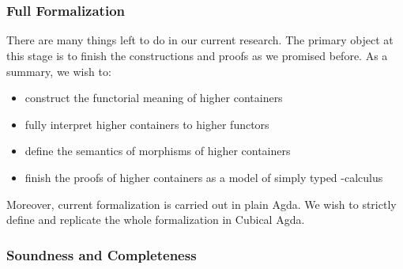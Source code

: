 \begin{code}[hide]
\AgdaSymbol{:}\AgdaSpace{}%
\AgdaSymbol{(}\AgdaSpace{}%
\AgdaSymbol{:}\AgdaSpace{}%
\AgdaSymbol{)}\AgdaSpace{}%
\AgdaSpace{}%
\AgdaSymbol{(}\AgdaSpace{}%
\AgdaSpace{}%
\AgdaSpace{}%
\AgdaSpace{}%
\AgdaSymbol{)}\AgdaSpace{}%
\AgdaSpace{}%
\AgdaSpace{}%
\AgdaSpace{}%
\<%
\\
\>[0]\AgdaSpace{}%
\AgdaSymbol{=}\AgdaSpace{}%
\<%
\\
\>[0]\AgdaSpace{}%
\AgdaSpace{}%
\AgdaSpace{}%
\AgdaSpace{}%
\AgdaSpace{}%
\AgdaSpace{}%
\AgdaSymbol{)}\AgdaSpace{}%
\AgdaSymbol{=}\AgdaSpace{}%
\AgdaFunction{Σtm[}\AgdaSpace{}%
\AgdaSpace{}%
\AgdaSpace{}%
\AgdaSpace{}%
\AgdaFunction{]}\AgdaSpace{}%
\<%
\end{code}

\subsubsection*{Full Formalization}

There are many things left to do in our current research. The primary object at this stage is to finish the constructions and proofs as we promised before. As a summary, we wish to:

\begin{itemize}
  \item{construct the functorial meaning of higher containers}
  \item{fully interpret higher containers to higher functors}
  \item{define the semantics of morphisms of higher containers}
  \item{finish the proofs of higher containers as a model of simply typed \lambda-calculus}
\end{itemize}

Moreover, current formalization is carried out in plain Agda. We wish to strictly define and replicate the whole formalization in Cubical Agda.

\subsubsection*{Soundness and Completeness}

